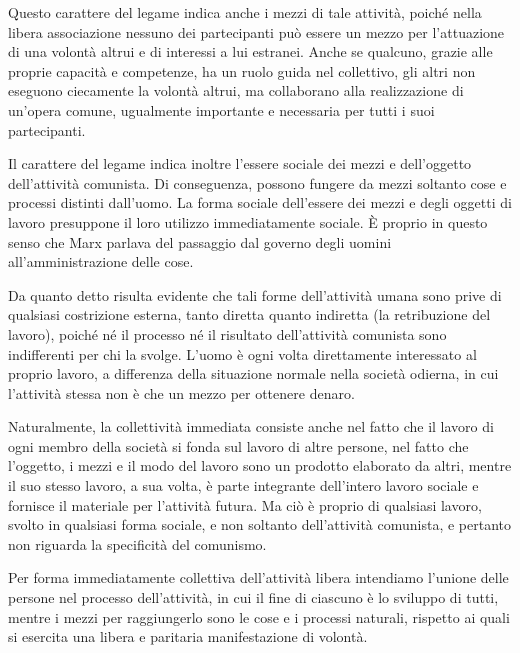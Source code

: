 \documentclass[../main]{subfiles}
\begin{document}
Questo carattere del legame indica anche i mezzi di tale attività, poiché nella libera associazione nessuno dei partecipanti può essere un mezzo per l'attuazione di una volontà altrui e di interessi a lui estranei. Anche se qualcuno, grazie alle proprie capacità e competenze, ha un ruolo guida nel collettivo, gli altri non eseguono ciecamente la volontà altrui, ma collaborano alla realizzazione di un'opera comune, ugualmente importante e necessaria per tutti i suoi partecipanti.

Il carattere del legame indica inoltre l'essere sociale dei mezzi e dell'oggetto dell'attività comunista. Di conseguenza, possono fungere da mezzi soltanto cose e processi distinti dall'uomo. La forma sociale dell'essere dei mezzi e degli oggetti di lavoro presuppone il loro utilizzo immediatamente sociale. È proprio in questo senso che Marx parlava del passaggio dal governo degli uomini all'amministrazione delle cose.

Da quanto detto risulta evidente che tali forme dell'attività umana sono prive di qualsiasi costrizione esterna, tanto diretta quanto indiretta (la retribuzione del lavoro), poiché né il processo né il risultato dell'attività comunista sono indifferenti per chi la svolge. L'uomo è ogni volta direttamente interessato al proprio lavoro, a differenza della situazione normale nella società odierna, in cui l'attività stessa non è che un mezzo per ottenere denaro.

Naturalmente, la collettività immediata consiste anche nel fatto che il lavoro di ogni membro della società si fonda sul lavoro di altre persone, nel fatto che l'oggetto, i mezzi e il modo del lavoro sono un prodotto elaborato da altri, mentre il suo stesso lavoro, a sua volta, è parte integrante dell'intero lavoro sociale e fornisce il materiale per l'attività futura. Ma ciò è proprio di qualsiasi lavoro, svolto in qualsiasi forma sociale, e non soltanto dell'attività comunista, e pertanto non riguarda la specificità del comunismo.

Per forma immediatamente collettiva dell'attività libera intendiamo l'unione delle persone nel processo dell'attività, in cui il fine di ciascuno è lo sviluppo di tutti, mentre i mezzi per raggiungerlo sono le cose e i processi naturali, rispetto ai quali si esercita una libera e paritaria manifestazione di volontà.
\end{document}
